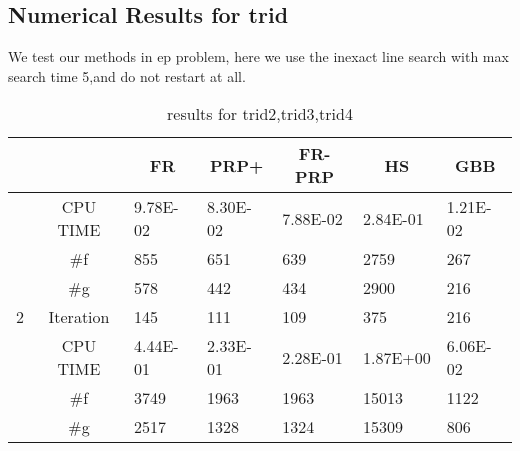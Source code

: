 \documentclass{article}
\begin{document}
\subsection{Numerical Results for trid}
We test our methods in ep problem, here we use the inexact line search with max search time 5,and do not restart at all.
\begin{table}[H]
	\caption{results for trid2,trid3,trid4}
			\centering
	\begin{tabular}{|c|c|l|l|l|l|l|}
		\hline
		&           & \multicolumn{1}{c|}{FR}         & \multicolumn{1}{c|}{PRP+}       & \multicolumn{1}{c|}{FR-PRP}     & \multicolumn{1}{c|}{HS}         & \multicolumn{1}{c|}{GBB}        \\ \hline
		& CPU TIME  & {\color[HTML]{000000} 9.78E-02} & {\color[HTML]{000000} 8.30E-02} & {\color[HTML]{000000} 7.88E-02} & {\color[HTML]{000000} 2.84E-01} & {\color[HTML]{000000} 1.21E-02} \\ \cline{2-7} 
		& \#f       & {\color[HTML]{000000} 855}      & {\color[HTML]{000000} 651}      & {\color[HTML]{000000} 639}      & {\color[HTML]{000000} 2759}     & {\color[HTML]{000000} 267}      \\ \cline{2-7} 
		& \#g       & {\color[HTML]{000000} 578}      & {\color[HTML]{000000} 442}      & {\color[HTML]{000000} 434}      & {\color[HTML]{000000} 2900}     & {\color[HTML]{000000} 216}      \\ \cline{2-7} 
		\multirow{-4}{*}{2} & Iteration & {\color[HTML]{000000} 145}      & {\color[HTML]{000000} 111}      & {\color[HTML]{000000} 109}      & {\color[HTML]{000000} 375}      & {\color[HTML]{000000} 216}      \\ \hline
		& CPU TIME  & {\color[HTML]{000000} 4.44E-01} & {\color[HTML]{000000} 2.33E-01} & {\color[HTML]{000000} 2.28E-01} & {\color[HTML]{000000} 1.87E+00} & {\color[HTML]{000000} 6.06E-02} \\ \cline{2-7} 
		& \#f       & {\color[HTML]{000000} 3749}     & {\color[HTML]{000000} 1963}     & {\color[HTML]{000000} 1963}     & {\color[HTML]{000000} 15013}    & {\color[HTML]{000000} 1122}     \\ \cline{2-7} 
		& \#g       & {\color[HTML]{000000} 2517}     & {\color[HTML]{000000} 1328}     & {\color[HTML]{000000} 1324}     & {\color[HTML]{000000} 15309}    & {\color[HTML]{000000} 806}      \\ \cline{2-7} 

\end{tabular}
\end{table}
\end{document}
